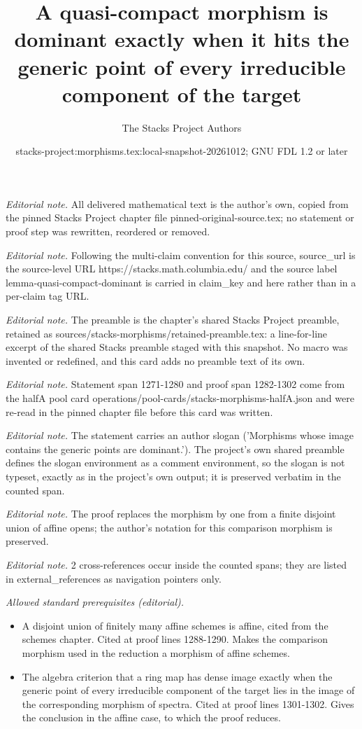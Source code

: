 \documentclass[10pt,a4paper]{amsart}
\title{A quasi-compact morphism is dominant exactly when it hits the generic point of every irreducible component of the target}
\author{The Stacks Project Authors}
\date{stacks-project:morphisms.tex:local-snapshot-20261012; GNU FDL 1.2 or later}
\theoremstyle{plain}
\theoremstyle{definition}
\theoremstyle{remark}
\numberwithin{equation}{subsection}
\begin{document}
\maketitle
\noindent\textit{Editorial note.} All delivered mathematical text is the author's own, copied from the pinned Stacks Project chapter file pinned-original-source.tex; no statement or proof step was rewritten, reordered or removed.\par\medskip
\noindent\textit{Editorial note.} Following the multi-claim convention for this source, source\_url is the source-level URL https://stacks.math.columbia.edu/ and the source label lemma-quasi-compact-dominant is carried in claim\_key and here rather than in a per-claim tag URL.\par\medskip
\noindent\textit{Editorial note.} The preamble is the chapter's shared Stacks Project preamble, retained as sources/stacks-morphisms/retained-preamble.tex: a line-for-line excerpt of the shared Stacks preamble staged with this snapshot. No macro was invented or redefined, and this card adds no preamble text of its own.\par\medskip
\noindent\textit{Editorial note.} Statement span 1271-1280 and proof span 1282-1302 come from the halfA pool card operations/pool-cards/stacks-morphisms-halfA.json and were re-read in the pinned chapter file before this card was written.\par\medskip
\noindent\textit{Editorial note.} The statement carries an author slogan ('Morphisms whose image contains the generic points are dominant.'). The project's own shared preamble defines the slogan environment as a comment environment, so the slogan is not typeset, exactly as in the project's own output; it is preserved verbatim in the counted span.\par\medskip
\noindent\textit{Editorial note.} The proof replaces the morphism by one from a finite disjoint union of affine opens; the author's notation for this comparison morphism is preserved.\par\medskip
\noindent\textit{Editorial note.} 2 cross-references occur inside the counted spans; they are listed in external\_references as navigation pointers only.\par\medskip
\noindent\textit{Allowed standard prerequisites (editorial).}\begin{itemize}
\item A disjoint union of finitely many affine schemes is affine, cited from the schemes chapter. Cited at proof lines 1288-1290. Makes the comparison morphism used in the reduction a morphism of affine schemes.
\item The algebra criterion that a ring map has dense image exactly when the generic point of every irreducible component of the target lies in the image of the corresponding morphism of spectra. Cited at proof lines 1301-1302. Gives the conclusion in the affine case, to which the proof reduces.
\end{itemize}\medskip
\end{document}
